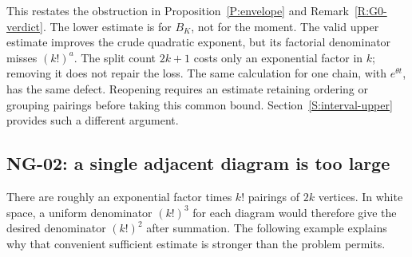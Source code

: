This restates the obstruction in Proposition~\ref{P:envelope} and
Remark~\ref{R:G0-verdict}. The lower estimate is for $B_K$, not for the
moment. The valid upper estimate improves the crude quadratic exponent,
but its factorial denominator misses $(k!)^a$. The split count $2k+1$
costs only an exponential factor in $k$; removing it does not repair the
loss. The same calculation for one chain, with $e^{\theta t}$, has the
same defect. Reopening requires an estimate retaining ordering or grouping
pairings before taking this common bound. Section~\ref{S:interval-upper}
provides such a different argument.

\subsection{NG-02: a single adjacent diagram is too large}
\label{S:nogo-02}

There are roughly an exponential factor times $k!$ pairings of $2k$
vertices. In white space, a uniform denominator $(k!)^3$ for each diagram
would therefore give the desired denominator $(k!)^2$ after summation.
The following example explains why that convenient sufficient estimate is
stronger than the problem permits.

